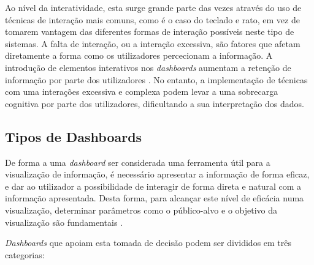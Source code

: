 Ao nível da interatividade, esta surge grande parte das vezes através do uso de técnicas de interação mais comuns, como é o caso do teclado e rato, em vez de tomarem vantagem das diferentes formas de interação possíveis neste tipo de sistemas. A falta de interação, ou a interação excessiva, são fatores que afetam diretamente a forma como os utilizadores percecionam a informação. A introdução de elementos interativos nos \textit{dashboards} aumentam a retenção de informação por parte dos utilizadores \cite{heer2012interactive}. No entanto, a implementação de técnicas com uma interações excessiva e complexa podem levar a uma sobrecarga cognitiva por parte dos utilizadores, dificultando a sua interpretação dos dados.


\subsection{Tipos de Dashboards} %
\label{sub:tipos_dashboards}
De forma a uma \textit{dashboard} ser considerada uma ferramenta útil para a visualização de informação, é necessário apresentar a informação de forma eficaz, e dar ao utilizador a possibilidade de interagir de forma direta e natural com a informação apresentada. Desta forma, para alcançar este nível de eficácia numa visualização, determinar parâmetros como o público-alvo e o objetivo da visualização são fundamentais \cite{pappas2011riding}.

\textit{Dashboards} que apoiam esta tomada de decisão podem ser divididos em três categorias:

